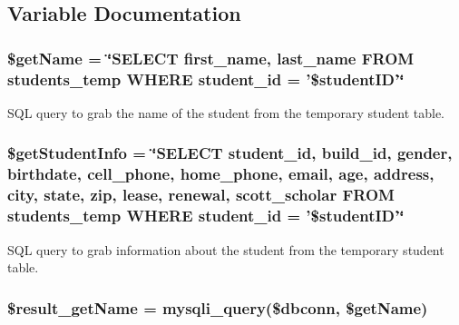 \subsection{\-Variable \-Documentation}
\hypertarget{displayStudentInfo_8php_a8475c55a95335ffc4309e9001d7d1fa3}{
\subsubsection[{\$get\-Name}]{\setlength{\rightskip}{0pt plus 5cm}\$get\-Name = \char`\"{}\-S\-E\-L\-E\-C\-T first\-\_\-name, last\-\_\-name \-F\-R\-O\-M students\-\_\-temp \-W\-H\-E\-R\-E student\-\_\-id = '\$student\-I\-D'\char`\"{}}}\label{displayStudentInfo_8php_a8475c55a95335ffc4309e9001d7d1fa3}
\-S\-Q\-L query to grab the name of the student from the temporary student table. \hypertarget{displayStudentInfo_8php_afacc031eed5b55847cdf634cbac8b9a6}{
\subsubsection[{\$get\-Student\-Info}]{\setlength{\rightskip}{0pt plus 5cm}\$get\-Student\-Info = \char`\"{}\-S\-E\-L\-E\-C\-T student\-\_\-id, build\-\_\-id, gender, birthdate, cell\-\_\-phone, home\-\_\-phone, email, age, address, city, state, zip, lease, renewal, scott\-\_\-scholar \-F\-R\-O\-M students\-\_\-temp \-W\-H\-E\-R\-E student\-\_\-id = '\$student\-I\-D'\char`\"{}}}\label{displayStudentInfo_8php_afacc031eed5b55847cdf634cbac8b9a6}
\-S\-Q\-L query to grab information about the student from the temporary student table. \hypertarget{displayStudentInfo_8php_abf07436f24cd62ffb968c81f8bcbe272}{
\subsubsection[{\$result\-\_\-get\-Name}]{\setlength{\rightskip}{0pt plus 5cm}\$result\-\_\-get\-Name = mysqli\-\_\-query(\$dbconn, \$get\-Name)}}\label{displayStudentInfo_8php_abf07436f24cd62ffb968c81f8bcbe272}
